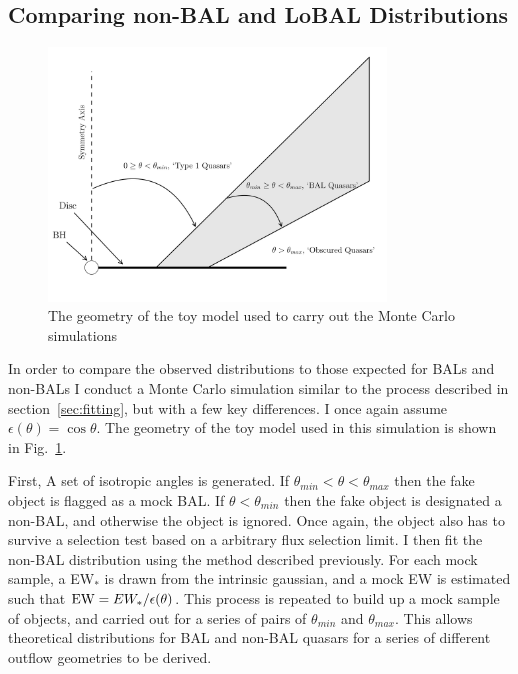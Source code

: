 \subsection{Comparing non-BAL and LoBAL Distributions}
\label{sec:bal_v_nonbal}

\begin{figure}
\centering
\includegraphics[width=0.8\textwidth]{figures/ewpaper/fig2_cartoon.png}
\caption
{
The geometry of the toy model used to carry out the Monte Carlo simulations
}
\label{fig:cartoon}
\end{figure}

In order to compare the observed distributions to those expected for BALs and
non-BALs I conduct a Monte Carlo simulation similar to
the process described in section~\ref{sec:fitting}, but with a few 
key differences. I once again assume $\epsilon(\theta) = \cos \theta$.
The geometry of the toy model used in this simulation is shown in
Fig.~\ref{fig:cartoon}.

First, A set of isotropic angles is generated.
If $\theta_{min}<\theta<\theta_{max}$ then the fake object 
is flagged as a mock BAL. If $\theta<\theta_{min}$ then the 
fake object is designated a non-BAL, and otherwise
the object is ignored. Once again, the object also has to 
survive a selection test based on a arbitrary flux selection limit.
I then fit the non-BAL distribution using the method described previously.
For each mock sample, a EW$_*$ is drawn from the intrinsic gaussian,
and a mock EW is estimated such that ${\rm EW} = EW_* / \epsilon(\theta)$.
This process is repeated to build up a mock sample of objects, and 
carried out for a series of pairs of $\theta_{min}$ and $\theta_{max}$.
This allows theoretical distributions for BAL and non-BAL quasars
for a series of different outflow geometries to be derived.

